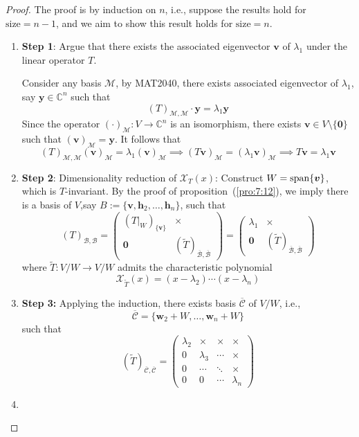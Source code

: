 \begin{proof}
The proof is by induction on $n$, i.e., suppose the results hold for $\text{size}=n-1$, and we aim to show this result holds for $\text{size}=n$.
\begin{enumerate}
\item
\textbf{Step 1}:
Argue that there exists the associated eigenvector $\bm v$ of $\lambda_1$ under the linear operator $T$.

Consider any basis $\mathcal{M}$, by MAT2040, there exists associated eigenvector of $\lambda_1$, say $\bm y\in\mathbb{C}^n$ such that
\[
(T)_{\mathcal{M},\mathcal{M}}\cdot\bm y = \lambda_1\bm y
\]
Since the operator $(\cdot)_{\mathcal{M}}:V\to\mathbb{C}^n$ is an isomorphism, there exists $\bm v\in V\setminus\{\bm0\}$ such that $(\bm v)_{\mathcal{M}} = \bm y$. It follows that
\[
(T)_{\mathcal{M},\mathcal{M}}(\bm v)_{\mathcal{M}} = \lambda_1(\bm v)_{\mathcal{M}}\implies
(T\bm v)_{\mathcal{M}} = (\lambda_1\bm v)_{\mathcal{M}}\implies
T\bm v = \lambda_1\bm v
\]
\item
\textbf{Step 2}:
Dimensionality reduction of $\mathcal{X}_T(x)$:
Construct $W=\operatorname{span}\{\bm v\}$, which is $T$-invariant.
By the proof of proposition~(\ref{pro:7:12}), we imply there is a basis of $V$,say $B:=\{\bm v,\bm h_2,\dots,\bm h_n\}$, such that
\[
(T)_{\mathcal{B},\mathcal{B}}=\begin{pmatrix}
(T|_W)_{\{\bm v\}}&\times\\\bm0&(\tilde{T})_{\overline{\mathcal{B}},\overline{\mathcal{B}}}
\end{pmatrix}
=
\begin{pmatrix}
\lambda_1&\times\\\bm0&(\tilde{T})_{\overline{\mathcal{B}},\overline{\mathcal{B}}}
\end{pmatrix}
\]
where $\tilde{T}:V/W\to V/W$ admits the characteristic polynomial
\[
\mathcal{X}_{\tilde{T}}(x) = (x-\lambda_2)\cdots(x-\lambda_n)
\]
\item
\textbf{Step 3:}
Applying the induction, 
there exists basis $\overline{\mathcal{C}}$ of $V/W$, i.e.,
\[
\overline{\mathcal{C}} = \{\bm w_2+W,\dots,\bm w_n+W\}
\]
such that
\[
(\tilde{T})_{\overline{\mathcal{C}},\overline{\mathcal{C}}}
=
\begin{pmatrix}
\lambda_2&\times&\times&\times\\
0&\lambda_3&\cdots&\times\\
0&\cdots&\ddots&\times\\
0&0&\cdots&\lambda_n
\end{pmatrix}
\]
\item

\end{enumerate}
\end{proof}
